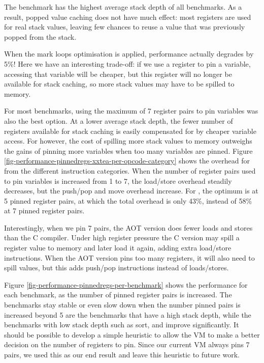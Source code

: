 The  benchmark has the highest average stack depth of all benchmarks. As a result, popped value caching does not have much effect: most registers are used for real stack values, leaving few chances to reuse a value that was previously popped from the stack. 

When the mark loops optimisation is applied, performance actually degrades by 5\%! Here we have an interesting trade-off: if we use a register to pin a variable, accessing that variable will be cheaper, but this register will no longer be available for stack caching, so more stack values may have to be spilled to memory.

For most benchmarks, using the maximum of 7 register pairs to pin variables was also the best option. At a lower average stack depth, the fewer number of registers available for stack caching is easily compensated for by cheaper variable access. For  however, the cost of spilling more stack values to memory outweighs the gains of pinning more variables when too many variables are pinned. Figure \ref{fig-performance-pinnedregs-xxtea-per-opcode-category} shows the overhead for  from the different instruction categories. When the number of register pairs used to pin variables is increased from 1 to 7, the load/store overhead steadily decreases, but the push/pop and move overhead increase. For , the optimum is at 5 pinned register pairs, at which the total overhead is only 43\%, instead of 58\% at 7 pinned register pairs.

Interestingly, when we pin 7 pairs, the AOT version does fewer loads and stores than the C compiler. Under high register pressure the C version may spill a register value to memory and later load it again, adding extra load/store instructions. When the AOT version pins too many registers, it will also need to spill values, but this adds push/pop instructions instead of loads/stores.

Figure \ref{fig-performance-pinnedregs-per-benchmark} shows the performance for each benchmark, as the number of pinned register pairs is increased. The benchmarks stay stable or even slow down when the number pinned pairs is increased beyond 5 are the benchmarks that have a high stack depth, while the benchmarks with low stack depth such as sort,  and  improve significantly. It should be possible to develop a simple heuristic to allow the VM to make a better decision on the number of registers to pin. Since our current VM always pins 7 pairs, we used this as our end result and leave this heuristic to future work.

